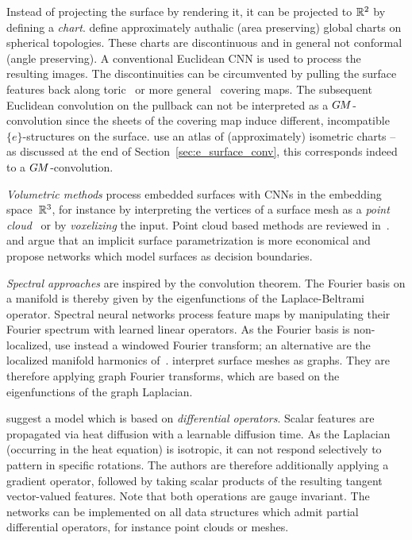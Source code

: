 Instead of projecting the surface by rendering it, it can be projected to $\mathbb{R}^2$ by defining a \emph{chart}.
\citet{sinha2016deep} define approximately authalic (area preserving) global charts on spherical topologies.
These charts are discontinuous and in general not conformal (angle preserving).
A conventional Euclidean CNN is used to process the resulting images.
The discontinuities can be circumvented by pulling the surface features back along toric~\cite{maron2017convolutional} or more general~\cite{haim2018surface,benhamu2018multichart} covering maps.
The subsequent Euclidean convolution on the pullback can not be interpreted as a $G\mkern-1.4muM$-convolution since the sheets of the covering map induce different, incompatible $\{e\}$-structures on the surface.
\citet{li2019crossAtlas} use an atlas of (approximately) isometric charts -- as discussed at the end of Section~\ref{sec:e_surface_conv}, this corresponds indeed to a $G\mkern-1.4muM$-convolution.


\emph{Volumetric methods} process embedded surfaces with CNNs in the embedding space~$\mathbb{R}^3$, for instance by interpreting the vertices of a surface mesh as a \emph{point cloud}~\cite{qi2017pointnet,qi2017pointnet++,thomas2019kpconv} or by \emph{voxelizing} the input.
Point cloud based methods are reviewed in~\cite{guo2020deep}.
\citet{mescheder2019occupancyNets} and \citet{peng2020occupancyCNNs} argue that an implicit surface parametrization is more economical and propose networks which model surfaces as decision boundaries.


\emph{Spectral approaches} are inspired by the convolution theorem.
The Fourier basis on a manifold is thereby given by the eigenfunctions of the Laplace-Beltrami operator.
Spectral neural networks process feature maps by manipulating their Fourier spectrum with learned linear operators.
As the Fourier basis is non-localized, \citet{boscaini2015learning} use instead a windowed Fourier transform; an alternative are the localized manifold harmonics of~\citet{melzi2018localized}.
\citet{bruna2013spectral} interpret surface meshes as graphs.
They are therefore applying graph Fourier transforms, which are based on the eigenfunctions of the graph Laplacian.


\citet{sharp2020diffusion} suggest a model which is based on \emph{differential operators}.
Scalar features are propagated via heat diffusion with a learnable diffusion time.
As the Laplacian (occurring in the heat equation) is isotropic, it can not respond selectively to pattern in specific rotations.
The authors are therefore additionally applying a gradient operator, followed by taking scalar products of the resulting tangent vector-valued features.
Note that both operations are gauge invariant.
The networks can be implemented on all data structures which admit partial differential operators, for instance point clouds or meshes.


